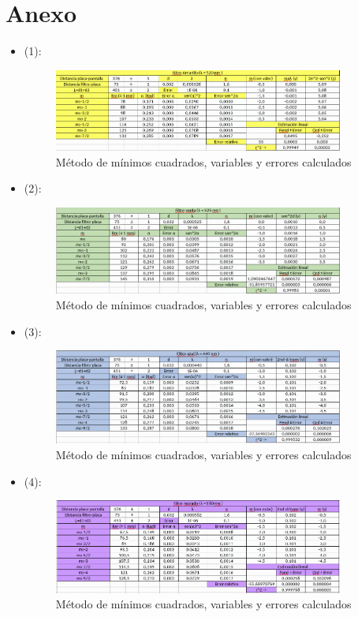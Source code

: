 \documentclass[11pt,letterpaper,twocolumn]{article}
\begin{document}
\onecolumn
\section{Anexo}%
\begin{itemize}
	\item (1): 
		\begin{figure}[H]
			\centering
			\includegraphics[width=0.9\textwidth]{imagen/anexo1.png}
			\caption{Método de mínimos cuadrados, variables y errores calculados}
			\label{fig:imagen-}
		\end{figure}

	\item (2): 
		\begin{figure}[H]
			\centering
			\includegraphics[width=0.9\textwidth]{imagen/anexo2.png}
			\caption{Método de mínimos cuadrados, variables y errores calculados}
			\label{fig:imagen-}
		\end{figure}

	\item (3): 
		\begin{figure}[H]
			\centering
			\includegraphics[width=0.9\textwidth]{imagen/anexo3.png}
			\caption{Método de mínimos cuadrados, variables y errores calculados}
			\label{fig:imagen-}
		\end{figure}
\newpage
	\item (4): 
		\begin{figure}[H]
			\centering
			\includegraphics[width=0.9\textwidth]{imagen/anexo4.png}
			\caption{Método de mínimos cuadrados, variables y errores calculados}
			\label{fig:imagen-}
		\end{figure}
\end{itemize}
\end{document}
